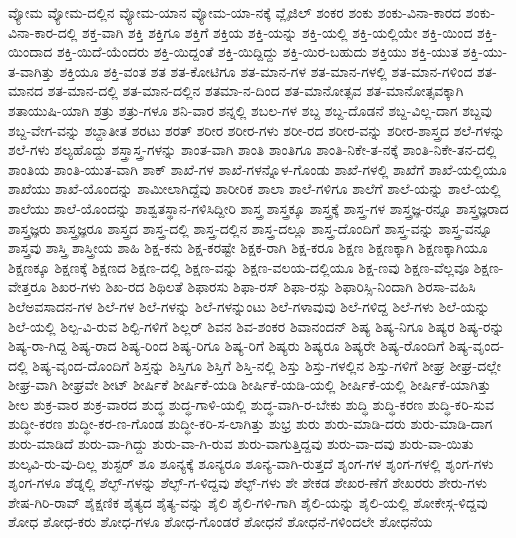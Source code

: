 {ವ್ಯೋಮ
ವ್ಯೋಮ-ದಲ್ಲಿನ
ವ್ಯೋಮ-ಯಾನ
ವ್ಯೋಮ-ಯಾ-ನಕ್ಕೆ
ವ್ಲೈಜಿಲ್
ಶಂಕರ
ಶಂಕು
ಶಂಕು-ವಿನಾ-ಕಾರದ
ಶಂಕು-ವಿನಾ-ಕಾರ-ದಲ್ಲಿ
ಶಕ್ತ-ವಾಗಿ
ಶಕ್ತಿ
ಶಕ್ತಿಗೂ
ಶಕ್ತಿಗೆ
ಶಕ್ತಿಯ
ಶಕ್ತಿ-ಯನ್ನು
ಶಕ್ತಿ-ಯಲ್ಲಿ
ಶಕ್ತಿ-ಯಲ್ಲಿಯೇ
ಶಕ್ತಿ-ಯಿಂದ
ಶಕ್ತಿ-ಯಿಂದಾದ
ಶಕ್ತಿ-ಯಿದೆ-ಯೆಂದರು
ಶಕ್ತಿ-ಯಿದ್ದಂತೆ
ಶಕ್ತಿ-ಯಿದ್ದಿದ್ದು
ಶಕ್ತಿ-ಯಿರ-ಬಹುದು
ಶಕ್ತಿಯು
ಶಕ್ತಿ-ಯುತ
ಶಕ್ತಿ-ಯು-ತ-ವಾಗಿತ್ತು
ಶಕ್ತಿಯೂ
ಶಕ್ತಿ-ವಂತ
ಶತ
ಶತ-ಕೋಟಿಗೂ
ಶತ-ಮಾನ-ಗಳ
ಶತ-ಮಾನ-ಗಳಲ್ಲಿ
ಶತ-ಮಾನ-ಗಳಿಂದ
ಶತ-ಮಾನದ
ಶತ-ಮಾನ-ದಲ್ಲಿ
ಶತ-ಮಾನ-ದಲ್ಲಿನ
ಶತಮಾ-ನ-ದಿಂದ
ಶತ-ಮಾನೋತ್ಸವ
ಶತ-ಮಾನೋತ್ಸವಕ್ಕಾಗಿ
ಶತಾಯುಷಿ-ಯಾಗಿ
ಶತ್ರು
ಶತ್ರು-ಗಳೂ
ಶನಿ-ವಾರ
ಶನ್ನಲ್ಲಿ
ಶಬಲ-ಗಳ
ಶಬ್ದ
ಶಬ್ದ-ದೊಡನೆ
ಶಬ್ದ-ವಿಲ್ಲ-ದಾಗ
ಶಬ್ದವು
ಶಬ್ದ-ವೇಗ-ವನ್ನು
ಶಬ್ದಾತೀತ
ಶರಟು
ಶರತ್
ಶರೀರ
ಶರೀರ-ಗಳು
ಶರೀ-ರದ
ಶರೀರ-ವನ್ನು
ಶರೀರ-ಶಾಸ್ತ್ರದ
ಶಲೆ-ಗಳನ್ನು
ಶಲೆ-ಗಳು
ಶಲ್ಯಹೊದ್ದು
ಶಸ್ತ್ರಾಸ್ತ್ರ-ಗಳನ್ನು
ಶಾಂತ-ವಾಗಿ
ಶಾಂತಿ
ಶಾಂತಿಗೂ
ಶಾಂತಿ-ನಿಕೇ-ತ-ನಕ್ಕೆ
ಶಾಂತಿ-ನಿಕೇ-ತನ-ದಲ್ಲಿ
ಶಾಂತಿಯ
ಶಾಂತಿ-ಯುತ-ವಾಗಿ
ಶಾಕ್
ಶಾಖೆ-ಗಳ
ಶಾಖೆ-ಗಳನ್ನೊಳ-ಗೊಂಡು
ಶಾಖೆ-ಗಳಲ್ಲಿ
ಶಾಖೆಗೆ
ಶಾಖೆ-ಯಲ್ಲಿಯೂ
ಶಾಖೆಯು
ಶಾಖೆ-ಯೊಂದನ್ನು
ಶಾಮೀಲಾಗಿದ್ದೆವು
ಶಾರೀರಿಕ
ಶಾಲಾ
ಶಾಲೆ-ಗಳಿಗೂ
ಶಾಲೆಗೆ
ಶಾಲೆ-ಯನ್ನು
ಶಾಲೆ-ಯಲ್ಲಿ
ಶಾಲೆಯು
ಶಾಲೆ-ಯೊಂದನ್ನು
ಶಾಶ್ವತಸ್ಥಾನ-ಗಳಿಸಿದ್ದೀರಿ
ಶಾಸ್ತ್ರ
ಶಾಸ್ತ್ರಕ್ಕೂ
ಶಾಸ್ತ್ರಕ್ಕೆ
ಶಾಸ್ತ್ರ-ಗಳ
ಶಾಸ್ತ್ರಜ್ಞ-ರನ್ನೂ
ಶಾಸ್ತ್ರಜ್ಞರಾದ
ಶಾಸ್ತ್ರಜ್ಞರು
ಶಾಸ್ತ್ರಜ್ಞರೂ
ಶಾಸ್ತ್ರದ
ಶಾಸ್ತ್ರ-ದಲ್ಲಿ
ಶಾಸ್ತ್ರ-ದಲ್ಲಿನ
ಶಾಸ್ತ್ರ-ದಲ್ಲೂ
ಶಾಸ್ತ್ರ-ದೊಂದಿಗೆ
ಶಾಸ್ತ್ರ-ವನ್ನು
ಶಾಸ್ತ್ರ-ವನ್ನೂ
ಶಾಸ್ತ್ರವು
ಶಾಸ್ತ್ರಿ
ಶಾಸ್ತ್ರೀಯ
ಶಾಹಿ
ಶಿಕ್ಷ-ಕನು
ಶಿಕ್ಷ-ಕರಷ್ಟೇ
ಶಿಕ್ಷಕ-ರಾಗಿ
ಶಿಕ್ಷ-ಕರೂ
ಶಿಕ್ಷಣ
ಶಿಕ್ಷಣಕ್ಕಾಗಿ
ಶಿಕ್ಷಣಕ್ಕಾಗಿಯೂ
ಶಿಕ್ಷಣಕ್ಕೂ
ಶಿಕ್ಷಣಕ್ಕೆ
ಶಿಕ್ಷಣದ
ಶಿಕ್ಷಣ-ದಲ್ಲಿ
ಶಿಕ್ಷಣ-ವನ್ನು
ಶಿಕ್ಷಣ-ವಲಯ-ದಲ್ಲಿಯೂ
ಶಿಕ್ಷ-ಣವು
ಶಿಕ್ಷಣ-ವೆಲ್ಲವೂ
ಶಿಕ್ಷಣ-ವೇತ್ತರೂ
ಶಿಖರ-ಗಳು
ಶಿಖ-ರದ
ಶಿಥಿಲತೆ
ಶಿಫಾರಸು
ಶಿಫಾ-ರಸ್
ಶಿಫಾ-ರಸ್ಸು
ಶಿಫಾರಿಸ್ಸಿ-ನಿಂದಾಗಿ
ಶಿರಸಾ-ವಹಿಸಿ
ಶಿಲೆಅವಸಾದನ-ಗಳ
ಶಿಲೆ-ಗಳ
ಶಿಲೆ-ಗಳನ್ನು
ಶಿಲೆ-ಗಳನ್ನುಂಟು
ಶಿಲೆ-ಗಳಾವುವು
ಶಿಲೆ-ಗಳಿದ್ದ
ಶಿಲೆ-ಗಳು
ಶಿಲೆ-ಯನ್ನು
ಶಿಲೆ-ಯಲ್ಲಿ
ಶಿಲ್ಪ-ವಿ-ರುವ
ಶಿಲ್ಪಿ-ಗಳಿಗೆ
ಶಿಲ್ಲರ್
ಶಿವನ
ಶಿವ-ಶಂಕರ
ಶಿವಾನಂದನ್
ಶಿಷ್ಯ
ಶಿಷ್ಯ-ನಿಗೂ
ಶಿಷ್ಯರ
ಶಿಷ್ಯ-ರನ್ನು
ಶಿಷ್ಯ-ರಾ-ಗಿದ್ದ
ಶಿಷ್ಯ-ರಾದ
ಶಿಷ್ಯ-ರಿಂದ
ಶಿಷ್ಯ-ರಿಗೂ
ಶಿಷ್ಯ-ರಿಗೆ
ಶಿಷ್ಯರು
ಶಿಷ್ಯರೂ
ಶಿಷ್ಯರೇ
ಶಿಷ್ಯ-ರೊಂದಿಗೆ
ಶಿಷ್ಯ-ವೃಂದ-ದಲ್ಲಿ
ಶಿಷ್ಯ-ವೃಂದ-ದೊಂದಿಗೆ
ಶಿಸ್ತನ್ನು
ಶಿಸ್ತಿಗೂ
ಶಿಸ್ತಿಗೆ
ಶಿಸ್ತಿ-ನಲ್ಲಿ
ಶಿಸ್ತು
ಶಿಸ್ತು-ಗಳಲ್ಲಿನ
ಶಿಸ್ತು-ಗಳಿಗೆ
ಶೀಘ್ರ
ಶೀಘ್ರ-ದಲ್ಲೇ
ಶೀಘ್ರ-ವಾಗಿ
ಶೀಘ್ರವೇ
ಶೀಟ್
ಶೀರ್ಷಿಕೆ
ಶೀರ್ಷಿಕೆ-ಯಡಿ
ಶೀರ್ಷಿಕೆ-ಯಡಿ-ಯಲ್ಲಿ
ಶೀರ್ಷಿಕೆ-ಯಲ್ಲಿ
ಶೀರ್ಷಿಕೆ-ಯಾಗಿತ್ತು
ಶೀಲ
ಶುಕ್ರ-ವಾರ
ಶುಕ್ರ-ವಾರದ
ಶುದ್ಧ
ಶುದ್ಧ-ಗಾಳಿ-ಯಲ್ಲಿ
ಶುದ್ಧ-ವಾಗಿ-ರ-ಬೇಕು
ಶುದ್ಧಿ
ಶುದ್ಧಿ-ಕರಣ
ಶುದ್ಧಿ-ಕರಿ-ಸುವ
ಶುದ್ಧೀ-ಕರಣ
ಶುದ್ಧೀ-ಕರ-ಣ-ಗೊಂಡ
ಶುದ್ಧೀ-ಕರಿ-ಸ-ಲಾಗಿತ್ತು
ಶುಭ್ರ
ಶುರು
ಶುರು-ಮಾಡಿ-ದರು
ಶುರು-ಮಾಡಿ-ದಾಗ
ಶುರು-ಮಾಡಿದೆ
ಶುರು-ವಾ-ಗಿದ್ದು
ಶುರು-ವಾ-ಗಿ-ರುವ
ಶುರು-ವಾಗುತ್ತಿದ್ದವು
ಶುರು-ವಾ-ದವು
ಶುರು-ವಾ-ಯಿತು
ಶುಲ್ಕವಿ-ರು-ವು-ದಿಲ್ಲ
ಶುಸ್ಟರ್
ಶೂ
ಶೂನ್ಯಕ್ಕೆ
ಶೂನ್ಯರೂ
ಶೂನ್ಯ-ವಾಗಿ-ರುತ್ತದೆ
ಶೃಂಗ-ಗಳ
ಶೃಂಗ-ಗಳಲ್ಲಿ
ಶೃಂಗ-ಗಳು
ಶೃಂಗ-ಗಳೂ
ಶೆಡ್ನಲ್ಲಿ
ಶೆಲ್ಫ್-ಗಳನ್ನು
ಶೆಲ್ಫ್-ಗ-ಳಿದ್ದವು
ಶೆಲ್ಫ್-ಗಳು
ಶೇ
ಶೇಕಡ
ಶೇಖರ-ಣೆಗೆ
ಶೇಖರರು
ಶೇರು-ಗಳು
ಶೇಷ-ಗಿರಿ-ರಾವ್
ಶೈಕ್ಷಣಿಕ
ಶೈತ್ಯದ
ಶೈತ್ಯ-ವನ್ನು
ಶೈಲಿ
ಶೈಲಿ-ಗಳಿ-ಗಾಗಿ
ಶೈಲಿ-ಯನ್ನು
ಶೈಲಿ-ಯಲ್ಲಿ
ಶೋಕೇಸ್ಗ-ಳಿದ್ದವು
ಶೋಧ
ಶೋಧ-ಕರು
ಶೋಧ-ಗಳೂ
ಶೋಧ-ಗೊಂಡರೆ
ಶೋಧನೆ
ಶೋಧನೆ-ಗಳಿಂದಲೇ
ಶೋಧನೆಯ
}
